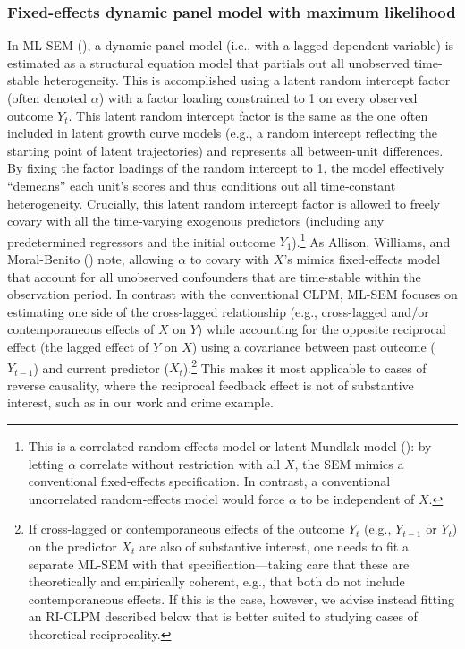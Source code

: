 \documentclass[
  letterpaper,
  DIV=11,
  numbers=noendperiod]{scrartcl}
\begin{document}
\subsubsection{Fixed-effects dynamic panel model with maximum
likelihood}\label{fixed-effects-dynamic-panel-model-with-maximum-likelihood}

In ML‐SEM (), a dynamic panel model (i.e., with a lagged
dependent variable) is estimated as a structural equation model that
partials out all unobserved time-stable heterogeneity. This is
accomplished using a latent random intercept factor (often denoted
\(\alpha\)) with a factor loading constrained to 1 on every observed
outcome \(Y_t\). This latent random intercept factor is the same as the
one often included in latent growth curve models (e.g., a random
intercept reflecting the starting point of latent trajectories) and
represents all between-unit differences. By fixing the factor loadings
of the random intercept to 1, the model effectively ``demeans'' each
unit's scores and thus conditions out all time‐constant heterogeneity.
Crucially, this latent random intercept factor is allowed to freely
covary with all the time‐varying exogenous predictors (including any
predetermined regressors and the initial outcome \(Y_1\)).\footnote{This
  is a correlated random‐effects model or latent Mundlak model
  (): by letting
  \(\alpha\) correlate without restriction with all \(X\), the SEM
  mimics a conventional fixed‐effects specification. In contrast, a
  conventional uncorrelated random‐effects model would force \(\alpha\)
  to be independent of \(X\).} As Allison, Williams, and Moral-Benito
() note, allowing \(\alpha\) to
covary with \(X\)'s mimics fixed-effects model that account for all
unobserved confounders that are time-stable within the observation
period. In contrast with the conventional CLPM, ML-SEM focuses on
estimating one side of the cross-lagged relationship (e.g., cross-lagged
and/or contemporaneous effects of \(X\) on \(Y\)) while accounting for
the opposite reciprocal effect (the lagged effect of \(Y\) on \(X\))
using a covariance between past outcome (\(Y_{t-1}\)) and current
predictor (\(X_t\)).\footnote{If cross-lagged or contemporaneous effects
  of the outcome \(Y_t\) (e.g., \(Y_{t-1}\) or \(Y_t\)) on the predictor
  \(X_t\) are also of substantive interest, one needs to fit a separate
  ML-SEM with that specification---taking care that these are
  theoretically and empirically coherent, e.g., that both do not include
  contemporaneous effects. If this is the case, however, we advise
  instead fitting an RI-CLPM described below that is better suited to
  studying cases of theoretical reciprocality.} This makes it most
applicable to cases of reverse causality, where the reciprocal feedback
effect is not of substantive interest, such as in our work and crime
example.
\end{document}
